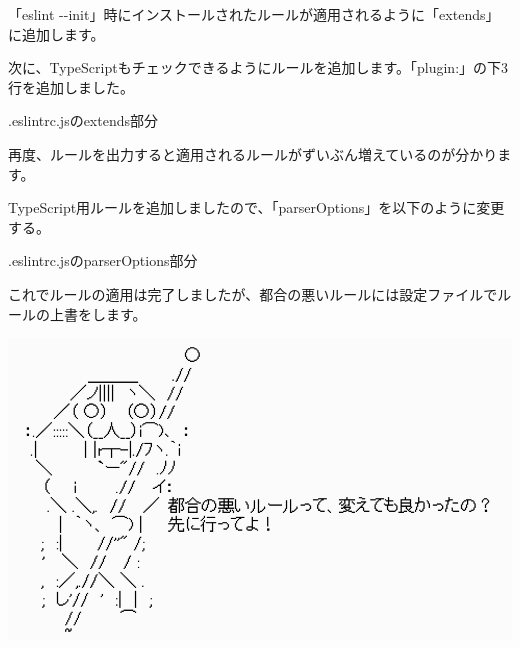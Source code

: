 「eslint {-}{-}init」時にインストールされたルールが適用されるように「extends」に追加します。

\vspace*{\baselineskip}

次に、TypeScriptもチェックできるようにルールを追加します。「plugin:」の下3行を追加しました。

\def\startercodeblockfontsize{}
\begin{starterprogram}[]{.eslintrc.jsのextends部分}\end{starterprogram}

再度、ルールを出力すると適用されるルールがずいぶん増えているのが分かります。

TypeScript用ルールを追加しましたので、「parserOptions」を以下のように変更する。

\def\startercodeblockfontsize{}
\begin{starterprogram}[]{.eslintrc.jsのparserOptions部分}\end{starterprogram}

これでルールの適用は完了しましたが、都合の悪いルールには設定ファイルでルールの上書をします。

\begin{reviewimage}[H]%
\includegraphics[width=0.7\maxwidth]{./images/02-create-react-app/rules2.png}%
\label{image:02-create-react-app:rules2}
\end{reviewimage}

